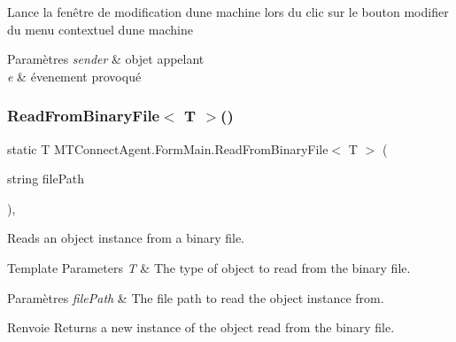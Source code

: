 Lance la fenêtre de modification d\textquotesingle{}une machine lors du clic sur le bouton modifier du menu contextuel d\textquotesingle{}une machine 


\begin{DoxyParams}{Paramètres}
{\em sender} & objet appelant\\
\hline
{\em e} & évenement provoqué\\
\hline
\end{DoxyParams}
\mbox{\label{class_m_t_connect_agent_1_1_form_main_af15030e628945bf0e6af793a954560b0}} 
\subsubsection{\texorpdfstring{Read\+From\+Binary\+File$<$ T $>$()}{ReadFromBinaryFile< T >()}}
{\footnotesize\ttfamily static T M\+T\+Connect\+Agent.\+Form\+Main.\+Read\+From\+Binary\+File$<$ T $>$ (\begin{DoxyParamCaption}\item[{string}]{file\+Path }\end{DoxyParamCaption})\hspace{0.3cm}{\ttfamily [inline]}, {\ttfamily [static]}}



Reads an object instance from a binary file. 


\begin{DoxyTemplParams}{Template Parameters}
{\em T} & The type of object to read from the binary file.\\
\hline
\end{DoxyTemplParams}

\begin{DoxyParams}{Paramètres}
{\em file\+Path} & The file path to read the object instance from.\\
\hline
\end{DoxyParams}
\begin{DoxyReturn}{Renvoie}
Returns a new instance of the object read from the binary file.
\end{DoxyReturn}
\mbox{\label{class_m_t_connect_agent_1_1_form_main_aac4a1cf234165d7c9c0b0c4691a88f8d}} 
